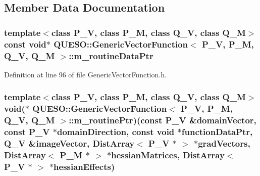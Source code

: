 \subsection{Member Data Documentation}
\hypertarget{class_q_u_e_s_o_1_1_generic_vector_function_a85df3216795107b164913ad339f0f813}{
\subsubsection[{m\-\_\-routine\-Data\-Ptr}]{\setlength{\rightskip}{0pt plus 5cm}template$<$class P\-\_\-\-V, class P\-\_\-\-M, class Q\-\_\-\-V, class Q\-\_\-\-M$>$ const void$\ast$ {\bf Q\-U\-E\-S\-O\-::\-Generic\-Vector\-Function}$<$ P\-\_\-\-V, P\-\_\-\-M, Q\-\_\-\-V, Q\-\_\-\-M $>$\-::m\-\_\-routine\-Data\-Ptr\hspace{0.3cm}{\ttfamily [protected]}}}\label{class_q_u_e_s_o_1_1_generic_vector_function_a85df3216795107b164913ad339f0f813}


Definition at line 96 of file Generic\-Vector\-Function.\-h.

\hypertarget{class_q_u_e_s_o_1_1_generic_vector_function_a1671b1c8c0d4eed14d203823af685a09}{
\subsubsection[{m\-\_\-routine\-Ptr}]{\setlength{\rightskip}{0pt plus 5cm}template$<$class P\-\_\-\-V, class P\-\_\-\-M, class Q\-\_\-\-V, class Q\-\_\-\-M$>$ void($\ast$ {\bf Q\-U\-E\-S\-O\-::\-Generic\-Vector\-Function}$<$ P\-\_\-\-V, P\-\_\-\-M, Q\-\_\-\-V, Q\-\_\-\-M $>$\-::m\-\_\-routine\-Ptr)(const P\-\_\-\-V \&domain\-Vector, const P\-\_\-\-V $\ast$domain\-Direction, const void $\ast$function\-Data\-Ptr, Q\-\_\-\-V \&image\-Vector, {\bf Dist\-Array}$<$ P\-\_\-\-V $\ast$ $>$ $\ast$grad\-Vectors, {\bf Dist\-Array}$<$ P\-\_\-\-M $\ast$ $>$ $\ast$hessian\-Matrices, {\bf Dist\-Array}$<$ P\-\_\-\-V $\ast$ $>$ $\ast$hessian\-Effects)\hspace{0.3cm}{\ttfamily [protected]}}}\label{class_q_u_e_s_o_1_1_generic_vector_function_a1671b1c8c0d4eed14d203823af685a09}


